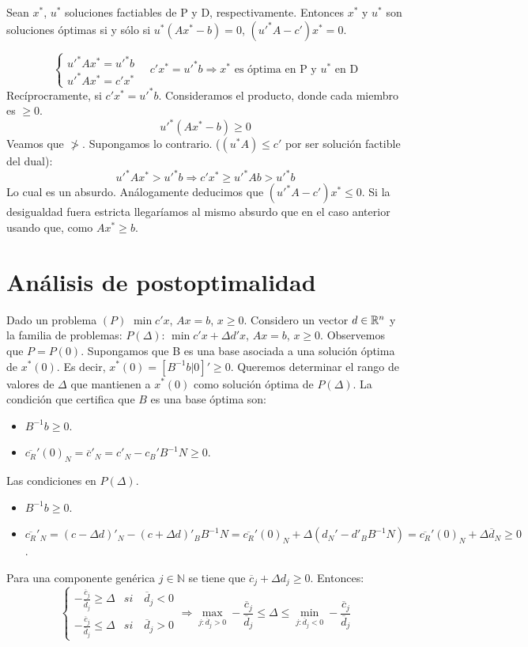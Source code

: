 \documentclass[PM.tex]{subfiles}
\begin{document}
\begin{theorem} Sean $x^*$, $u^*$ soluciones factiables de P y D, respectivamente. Entonces $x^*$ y $u^*$ son soluciones óptimas si y sólo si $u^*(Ax^*-b)=0$, $(u'^{*} A-c')x^*=0$.
\end{theorem}
\begin{dem}
\[
\begin{cases}
u'^* A x^* = u'^*b \\
u'^*A x^* = c'x^* 
\end{cases}
\quad c'x^* = u'^*b \Rightarrow \text{$x^*$ es óptima en P y $u^*$ en D}
\]
Recíprocramente, si $c'x^*=u'^*b$. Consideramos el producto, donde cada miembro es $\geq 0$.
\[
u'^*(Ax^*-b)\geq 0
\]
Veamos que $\not >$. Supongamos lo contrario. ($(u^*A) \leq c'$ por ser solución factible del dual):
\[
u'^*Ax^* > u'^* b \Rightarrow c'x^* \geq u'^*Ab>u'^*b
\]
Lo cual es un absurdo. Análogamente deducimos que $(u'^*A-c')x^* \leq 0$. Si la desigualdad fuera estricta llegaríamos al mismo absurdo que en el caso anterior usando que, como $Ax^* \geq b$.
\end{dem}
\section{Análisis de postoptimalidad}
Dado un problema $(P)$ $\min c'x$, $Ax=b$, $x\geq 0$. Considero un vector $d\in\mathbb{R}^n$ y la familia de problemas: $P(\Delta)$: $\min c'x + \Delta d'x$, $Ax=b$, $x\geq 0$. Observemos que $P=P(0)$. Supongamos que B es una base asociada a una solución óptima de $x^*(0)$. Es decir, $x^*(0)=[B^{-1}b | 0]' \geq 0$. Queremos determinar el rango de valores de $\Delta$ que mantienen a $x^*(0)$ como solución óptima de $P(\Delta)$. La condición que certifica que $B$ es una base óptima son:
\begin{itemize}
\item $B^{-1}b \geq 0$.
\item $\overline{c_R}'(0)_N  = \overline{c}'_N = c'_N - c_B'B^{-1}N \geq 0$. 
\end{itemize}
Las condiciones en $P(\Delta)$. 
\begin{itemize}
\item $B^{-1}b \geq 0$.
\item $\overline{c_R}'_N = (c -\Delta d)'_N- (c+\Delta d)'_B B^{-1}N = \overline{c_R}'(0)_N  + \Delta (d_N'-d'_BB^{-1}N) =  \overline{c_R}'(0)_N + \Delta \overline{d}_N\geq 0$. 
\end{itemize}
Para una componente genérica $j\in \mathbb{N}$ se tiene que $\overline{c}_j+\Delta d_j\geq 0$. Entonces:
\[
\begin{cases}
-\frac{\overline{c}_j}{\overline{d}_j} \geq \Delta & si \quad \overline{d}_j <0\\
-\frac{\overline{c}_j}{\overline{d}_j} \leq \Delta & si \quad \overline{d}_j >0
\end{cases}
\Rightarrow \max_{j:\overline{d}_j >0}-\frac{\overline{c}_j}{\overline{d}_j} \leq \Delta \leq \min_{j:\overline{d}_j <0}-\frac{\overline{c}_j}{\overline{d}_j}
\]
\end{document}
